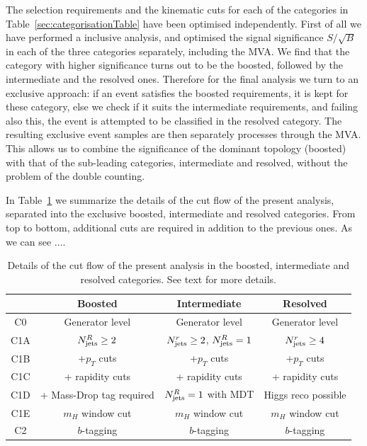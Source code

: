 The selection requirements and the kinematic cuts
for each of the categories in Table~\ref{sec:categorisationTable} have
been optimised independently.
%
First of all we have performed a inclusive analysis, and optimised the
signal significance
$S/\sqrt{B}$ in each of the three categories separately, including
the MVA.
%
We find that the category with higher significance turns out to be the boosted,
followed by the intermediate and the resolved ones.
%
Therefore for the final analysis we turn to an exclusive approach:
if an event satisfies the boosted requirements, it is kept for
these category, else we check if it suits the intermediate
requirements, and failing also this, the event is attempted to
be classified in the
resolved category.
%
The resulting exclusive event samples are then separately processes
through the MVA.
%
This allows us to combine the significance of the dominant topology
(boosted) with that of the sub-leading categories, intermediate
and resolved, without the problem of the double counting.



In Table~\ref{tab:cutflowdetails}
we summarize the details of the cut flow of the present analysis,
separated into the exclusive boosted, intermediate
    and resolved categories.
    From top to bottom, additional cuts are required in addition
    to the previous ones.
    As we can see ....
    

\begin{table}[t]
  \centering
  \begin{tabular}{|c|c|c|c|}
\hline
&  Boosted  &   Intermediate &  Resolved  \\
\hline
\hline
C0 &  Generator level &  Generator level & Generator level \\
\hline
C1A & $N_{\rm jets}^{R}\ge 2$ & $N_{\rm jets}^{r}\ge 2$, $N_{\rm jets}^{R}=1$  &
 $N_{\rm jets}^{r}\ge 4$ \\
 C1B & +$p_T$ cuts & +$p_T$ cuts
 & +$p_T$ cuts \\
 C1C & + rapidity cuts &  + rapidity cuts &
 + rapidity cuts \\
 C1D & + Mass-Drop tag required & $N_{\rm jets}^{R}=1$ with MDT  &
  Higgs reco possible \\
C1E & $m_H$ window cut & $m_H$ window cut & $m_H$ window cut  \\
\hline
C2 & $b$-tagging  &  $b$-tagging &  $b$-tagging \\
\hline
  \end{tabular}
  \caption{\small Details of the cut flow of the present analysis in the boosted, intermediate
    and resolved categories.
    See text for more details.
    \label{tab:cutflowdetails}
  }
\end{table}










